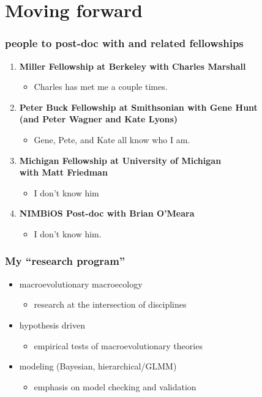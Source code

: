 \documentclass{beamer}
\begin{document}
\section{Moving forward}

\begin{frame}
  \frametitle{people to post-doc with and related fellowships}
  \begin{enumerate}
    \item \textbf{Miller Fellowship at Berkeley with Charles Marshall}
      \begin{itemize}
        \item Charles has met me a couple times.
      \end{itemize}
    \item \textbf{Peter Buck Fellowship at Smithsonian with Gene Hunt \\(and Peter Wagner and Kate Lyons)}
      \begin{itemize}
        \item Gene, Pete, and Kate all know who I am.
      \end{itemize}
    \item \textbf{Michigan Fellowship at University of Michigan \\with Matt Friedman}
      \begin{itemize}
        \item I don't know him
      \end{itemize}
    \item \textbf{NIMBiOS Post-doc with Brian O'Meara}
      \begin{itemize}
        \item I don't know him.
      \end{itemize}
  \end{enumerate}
\end{frame}

\begin{frame}
  \frametitle{My ``research program''}
  \begin{itemize}
    \item macroevolutionary macroecology
      \begin{itemize}
        \item research at the intersection of disciplines
      \end{itemize}
    \item hypothesis driven
      \begin{itemize}
        \item empirical tests of macroevolutionary theories
      \end{itemize}
    \item modeling (Bayesian, hierarchical/GLMM)
      \begin{itemize}
        \item emphasis on model checking and validation
      \end{itemize}
  \end{itemize}
\end{frame}
\end{document}
